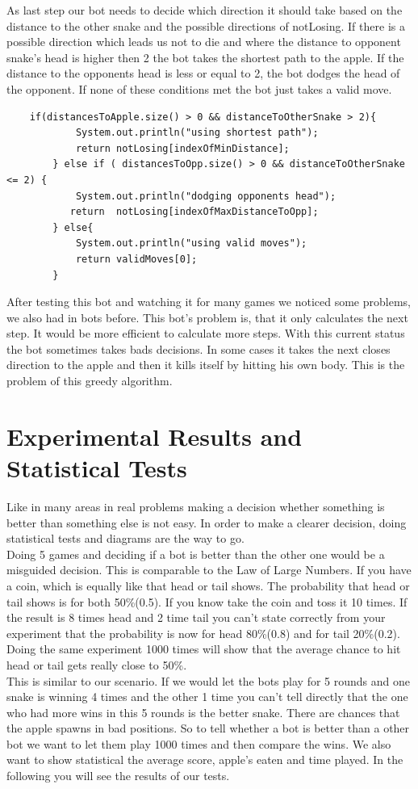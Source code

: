 \documentclass[a4paper,12pt]{article}
\begin{document}
As last step our bot needs to decide which direction it should take based on the distance to the other snake and the possible directions of notLosing. If there is a possible direction which leads us not to die and where the distance to opponent snake's head is higher then 2 the bot takes the shortest path to the apple. If the distance to the opponents head is less or equal to 2, the bot dodges the head of the opponent. If none of these conditions met the bot just takes a valid move.
\begin{verbatim}
	if(distancesToApple.size() > 0 && distanceToOtherSnake > 2){
            System.out.println("using shortest path");
            return notLosing[indexOfMinDistance];
        } else if ( distancesToOpp.size() > 0 && distanceToOtherSnake <= 2) {
            System.out.println("dodging opponents head");
           return  notLosing[indexOfMaxDistanceToOpp];
        } else{
            System.out.println("using valid moves");
            return validMoves[0];
        }
\end{verbatim}
After testing this bot and watching it for many games we noticed some problems, we also had in bots before. This bot's problem is, that it only calculates the next step. It would be more efficient to calculate more steps. With this current status the bot sometimes takes bads decisions. In some cases it takes the next closes direction to the apple and then it kills itself by hitting his own body. This is the problem of this greedy algorithm. 
\section{Experimental Results and Statistical Tests}
Like in many areas in real problems making a decision whether something is better than something else is not easy. In order to make a clearer decision, doing statistical tests and diagrams are the way to go.\\
Doing 5 games and deciding if a bot is better than the other one would be a misguided decision. This is comparable to the Law of Large Numbers. If you have a coin, which is equally like that head or tail shows. The probability that head or tail shows is for both 50\%(0.5). If you know take the coin and toss it 10 times. If the result is 8 times head and 2 time tail you can't state correctly from your experiment that the probability is now for head 80\%(0.8) and for tail 20\%(0.2). Doing the same experiment 1000 times will show that the average chance to hit head or tail gets really close to 50\%.\\
This is similar to our scenario. If we would let the bots play for 5 rounds and one snake is winning 4 times and the other 1 time you can't tell directly that the one who had more wins in this 5 rounds is the better snake. There are chances that the apple spawns in bad positions. So to tell whether a bot is better than a other bot we want to let them play 1000 times and then compare the wins. We also want to show statistical the average score, apple's eaten and time played. In the following you will see the results of our tests.\newpage
\end{document}
